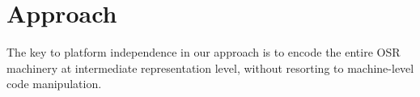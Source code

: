 \section{Approach}
\label{se:approach}

The key to platform independence in our approach is to encode the entire OSR machinery at intermediate representation level, without resorting to machine-level code manipulation.


  
  
  
  
  
  